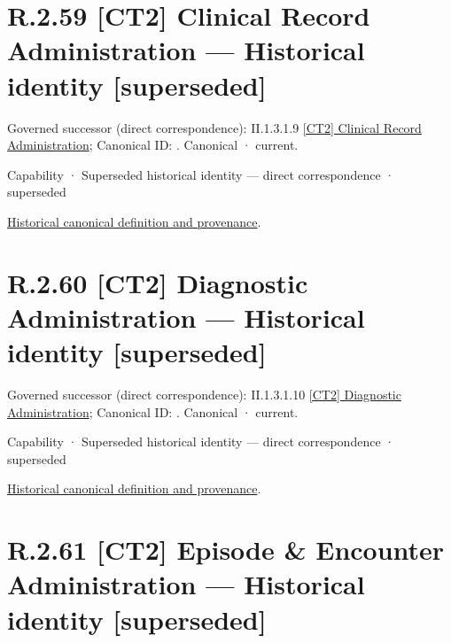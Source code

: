 \section*{R.2.59 [CT2] Clinical Record Administration — Historical identity [superseded]}
\label{navigation:R.2.59}

{\small Governed successor (direct correspondence): II.1.3.1.9 \hyperref[element:ce9e7e7b22054cefb707a650d5be7219]{[CT2] Clinical Record Administration}; Canonical ID: \texttt{}. Canonical · current.}\par
\label{element:be3f2e695eda403fbce8118daf83d386}
{\small Capability · Superseded historical identity — direct correspondence · superseded}\par
\href{../../../../../../../continuum/strategy/capability/be3f2e695eda403fbce8118daf83d386.md}{Historical canonical definition and provenance}.\par
\section*{R.2.60 [CT2] Diagnostic Administration — Historical identity [superseded]}
\label{navigation:R.2.60}

{\small Governed successor (direct correspondence): II.1.3.1.10 \hyperref[element:3cc720ba2e8b4d7a94bb349391d61895]{[CT2] Diagnostic Administration}; Canonical ID: \texttt{}. Canonical · current.}\par
\label{element:2b1a27d5d9944e05b4cf0fcaad4ca433}
{\small Capability · Superseded historical identity — direct correspondence · superseded}\par
\href{../../../../../../../continuum/strategy/capability/2b1a27d5d9944e05b4cf0fcaad4ca433.md}{Historical canonical definition and provenance}.\par
\section*{R.2.61 [CT2] Episode \& Encounter Administration — Historical identity [superseded]}
\label{navigation:R.2.61}

